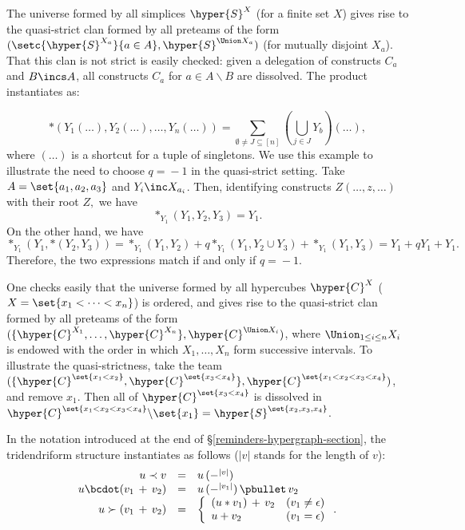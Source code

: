 \begin{example} \label{illustration-q-1}
The universe formed by all simplices $\hyper{S}^X$ (for a  finite set $X$) gives rise to the quasi-strict clan formed by all preteams of the form 
$(\setc{\hyper{S}^{X_a}}{a\in A},\hyper{S}^{\Union X_a})$ (for mutually disjoint $X_a$).  That this clan is not strict is easily checked: given a delegation of constructs $C_a$ and $B\incs A$, all constructs $C_a$ for $a\in A\backslash B$ are dissolved.
The   product instantiates as:

$$
\ast(Y_1(\ldots), Y_2(\ldots), \ldots, Y_n(\ldots)) = \sum_{\emptyset \neq J \subseteq [n]} (\bigcup_{j \in J} Y_b)(\ldots),
$$
where $(\ldots)$ is a shortcut for a tuple of singletons.
We use this example to illustrate the need to choose $q\!=\!-1$ in the quasi-strict setting.
Take $A=\set{a_1,a_2,a_3}$ and $Y_i\inc X_{a_i}$. Then, identifying constructs $Z(\ldots,z,\ldots)$ with their root $Z,$ we have
$$\ast_{Y_1}(Y_1,Y_2,Y_3)= Y_1.$$ 
On the other hand, we have  
$$\ast_{Y_1}(Y_1,\ast(Y_2,Y_3))
 = \ast_{Y_1}(Y_1,Y_2)+ q \ast_{Y_1}(Y_1,Y_2\cup Y_3) + \ast_{Y_1}(Y_1,Y_3)
=  Y_1 +qY_1 +Y_1.$$
Therefore, the two expressions match if and only if $q\!=\!-1$. \demo
\end{example}
\begin{example} \label{hypercube2-example}
 One checks easily that the universe formed by all   hypercubes $\hyper{C}^X$ ($X=\set{x_1<\cdots<x_n}$)  is ordered, and gives rise to the  quasi-strict clan formed by all preteams of the form 
$(\{\hyper{C}^{X_1},\ldots,\hyper{C}^{X_n}\},\hyper{C}^{\Union X_i})$, where $\Union_{1\leq i\leq n} X_i$ is endowed with the  order in which  $X_1,\ldots,X_n$ form successive intervals. To illustrate the quasi-strictness, take the team $(\{\hyper{C}^{\set{x_1<x_2}},\hyper{C}^{\set{x_3<x_4}}\},\hyper{C}^{\set{x_1<x_2<x_3<x_4}})$, and remove $x_1$. Then all of  $\hyper{C}^{\set{x_3<x_4}}$ is dissolved in 
$\hyper{C}^{\set{x_1<x_2<x_3<x_4}}\backslash\set{x_1}=\hyper{S}^{\set{x_2,x_3,x_4}}$.

In the notation introduced at the end of \S\ref{reminders-hypergraph-section}, the tridendriform structure instantiates  as follows ($|v|$ stands for the length of $v$):
$$\begin{array}{rcl}
u \prec v &=& u \,(-^{|v|}) \\
u \bcdot (v_1 \, +\,  v_2) &=& u\, (-^{|v_1|})\,\pbullet\, v_2\\
u \succ (v_1 \,+ \, v_2) &=& \left\{\begin{array}{ll} (u \ast v_1) \,+ \,v_2 & (v_1\neq\epsilon)\\
u+v_2 & (v_1=\epsilon)
\end{array}\right. .
\end{array}$$ \demo
\end{example} 
